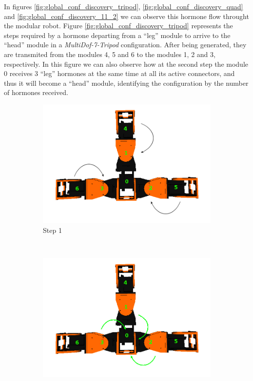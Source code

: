 In figures \ref{fig:global_conf_discovery_tripod}, \ref{fig:global_conf_discovery_quad} and \ref{fig:global_conf_discovery_11_2} we can observe this hormone flow throught the modular robot. Figure \ref{fig:global_conf_discovery_tripod} represents the steps required by a hormone departing from a ``leg'' module to arrive to the ``head'' module in a \emph{MultiDof-7-Tripod} configuration. After being generated, they are transmited from the modules 4, 5 and 6 to the modules 1, 2 and 3, respectively. In this figure we can also observe how at the second step the module 0 receives 3 ``leg'' hormones at the same time at all its active connectors, and thus it will become a ``head'' module, identifying the configuration by the number of hormones received.\\
\begin{figure}[h]
		\centering
        \begin{subfigure}[l]{0.45\textwidth}
                \centering
                \includegraphics[width=\textwidth]{images/Hormone_protocol_tripod_step1.png}
                \caption{Step 1}
                \label{fig:tripod_step1}
        \end{subfigure}
        ~
        \begin{subfigure}[r]{0.45\textwidth}
                \centering
                \includegraphics[width=\textwidth]{images/Hormone_protocol_tripod_step2.png}

\end{subfigure}
\end{figure}
